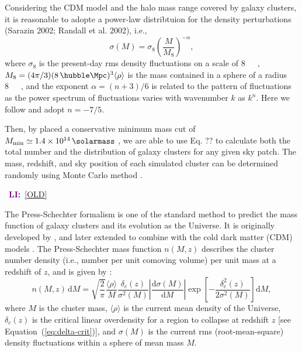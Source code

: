 \documentclass[modern]{aastex61}
\newcommand{\R}[1]{\mathrm{#1}}
\newcommand{\D}[1]{\R{d} #1}
\newcommand{\diff}[2]{\frac{\D{#1}}{\D{#2}}}
\newcommand{\LI}[1]{\textcolor{purple}{\textbf{LI:}}~\uline{#1}}
\begin{document}
Considering the CDM model and the halo mass range covered by galaxy
clusters, it is reasonable to adopte a power-law distribtuion
for the density perturbations (Sarazin 2002; Randall et al. 2002), i.e.,
\begin{equation}
  \sigma(M) = \sigma_8 \left( \frac{M}{M_8} \right)^{-\alpha},
\end{equation}
where $\sigma_8$ is the present-day rms density fluctuations on a
scale of \SI{8}{\per\hubble\Mpc},
$M_8 = (4\pi/3)(8 \,\si{\per\hubble\Mpc})^3 \langle{\rho}\rangle$
is the mass contained in a sphere of a radius \SI{8}{\per\hubble\Mpc},
and the exponent $\alpha = (n+3)/6$ is related to the pattern of
fluctuations
as the power spectrum of fluctuations varies with wavenumber $k$ as $k^n$.
Here we follow \citep{randall2002} and adopt $n = -7/5$.

Then, by placed a conservative minimum mass cut of $M_{\R{min}} \simeq
\SI{1.4e14}{\solarmass}$ \citep{zandanel2014},
we are able to use Eq. ?? to calculate both the total number and the
distribution of galaxy clusters for any given sky patch.
The mass, redshift, and sky position of each simulated cluster can be
determined randomly using Monte Carlo method \citep{wang2010}.

\noindent\hrulefill~\LI{[OLD]}~\hrulefill

The Press-Schechter formalism is one of the standard method to predict
the mass function of galaxy clusters and its evolution as the Universe.
It is originally developed by \citet{press1974}, and later extended to
combine with the cold dark matter (CDM) models
\citep[e.g.,][]{bond1991,lacey1993}.
The Press-Schechter mass function $n(M, z)$ describes the cluster
number density (i.e., number per unit comoving volume) per unit mass
at a redshift of $z$, and is given by \citep{press1974}:
\begin{equation}
  \label{eq:ps-mass-func}
  n(M, z) \,\D{M} = \sqrt{\frac{2}{\pi}} \frac{\langle{\rho}\rangle}{M}
  \frac{\delta_c(z)}{\sigma^2(M)} \left| \diff{\sigma(M)}{M} \right|
  \exp\!\left[ -\frac{\delta_c^2(z)}{2\sigma^2(M)} \right] \D{M},
\end{equation}
where
$M$ is the cluster mass,
$\langle {\rho} \rangle$ is the current mean density of the Universe,
$\delta_c(z)$ is the critical linear overdensity for a region to collapse
at redshift $z$ [see Equation~(\ref{eq:delta-crit})],
and $\sigma(M)$ is the current rms (root-mean-square) density fluctuations
within a sphere of mean mass $M$.
\end{document}
